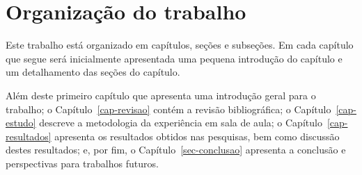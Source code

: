 \section{Organização do trabalho}
Este trabalho está organizado em capítulos, seções e subseções.
Em cada capítulo que segue será inicialmente
apresentada uma pequena introdução do capítulo e um detalhamento
das seções do capítulo.

Além deste primeiro capítulo que apresenta uma introdução geral
para o trabalho;
o Capítulo~\ref{cap-revisao} contém a revisão bibliográfica;
o Capítulo~\ref{cap-estudo} descreve a metodologia da experiência em sala de aula;
o Capítulo~\ref{cap-resultados} apresenta os resultados obtidos nas pesquisas, bem
como discussão destes resultados;
e, por fim, o Capítulo~\ref{sec-conclusao} apresenta a conclusão e perspectivas
para trabalhos futuros.
